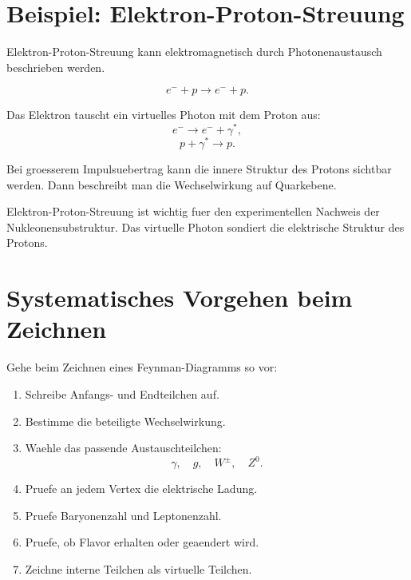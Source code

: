\section{Beispiel: Elektron-Proton-Streuung}

Elektron-Proton-Streuung kann elektromagnetisch durch Photonenaustausch beschrieben
werden.

\begin{formulabox}
\[
    e^- + p \rightarrow e^- + p.
\]
\end{formulabox}

\begin{conceptbox}
Das Elektron tauscht ein virtuelles Photon mit dem Proton aus:
\[
    e^- \rightarrow e^- + \gamma^*,
\]
\[
    p+\gamma^* \rightarrow p.
\]

Bei groesserem Impulsuebertrag kann die innere Struktur des Protons sichtbar werden.
Dann beschreibt man die Wechselwirkung auf Quarkebene.
\end{conceptbox}

\begin{examtipbox}
Elektron-Proton-Streuung ist wichtig fuer den experimentellen Nachweis der
Nukleonensubstruktur.
Das virtuelle Photon sondiert die elektrische Struktur des Protons.
\end{examtipbox}

\section{Systematisches Vorgehen beim Zeichnen}

\begin{examtipbox}
Gehe beim Zeichnen eines Feynman-Diagramms so vor:

\begin{enumerate}
    \item Schreibe Anfangs- und Endteilchen auf.
    \item Bestimme die beteiligte Wechselwirkung.
    \item Waehle das passende Austauschteilchen:
    \[
        \gamma,\quad g,\quad W^\pm,\quad Z^0.
    \]
    \item Pruefe an jedem Vertex die elektrische Ladung.
    \item Pruefe Baryonenzahl und Leptonenzahl.
    \item Pruefe, ob Flavor erhalten oder geaendert wird.
    \item Zeichne interne Teilchen als virtuelle Teilchen.
\end{enumerate}
\end{examtipbox}


